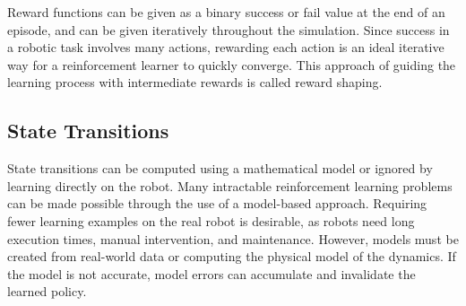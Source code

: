 \documentclass{article}
\begin{document}
Reward functions can be given as a binary success or fail value at the end of an episode, and can be given iteratively throughout the simulation. Since success in a robotic task involves many actions, rewarding each action is an ideal iterative way for a reinforcement learner to quickly converge. This approach of guiding the learning process with intermediate rewards is called reward shaping.


\subsection{State Transitions} \label{sec:State Transitions}
State transitions can be computed using a mathematical model or ignored by learning directly on the robot. Many intractable reinforcement learning problems can be made possible through the use of a model-based approach. Requiring fewer learning examples on the real robot is desirable, as robots need long execution times, manual intervention, and maintenance. However, models must be created from real-world data or computing the physical model of the dynamics. If the model is not accurate, model errors can accumulate and invalidate the learned policy.



\end{document}
